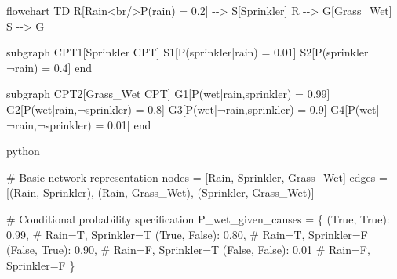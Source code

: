 \documentclass[
  11pt,
  letterpaper,
]{book}
\newenvironment{Shaded}{\begin{snugshade}}{\end{snugshade}}
\newcommand{\CommentTok}[1]{\textcolor[rgb]{0.37,0.37,0.37}{#1}}
\newcommand{\FloatTok}[1]{\textcolor[rgb]{0.68,0.00,0.00}{#1}}
\newcommand{\NormalTok}[1]{\textcolor[rgb]{0.00,0.23,0.31}{#1}}
\newcommand{\OperatorTok}[1]{\textcolor[rgb]{0.37,0.37,0.37}{#1}}
\newcommand{\StringTok}[1]{\textcolor[rgb]{0.13,0.47,0.30}{#1}}
\newcommand{\VariableTok}[1]{\textcolor[rgb]{0.07,0.07,0.07}{#1}}
\begin{document}
\begin{Shaded}
\begin{Highlighting}[]
\NormalTok{flowchart TD}
\NormalTok{    R[Rain\textless{}br/\textgreater{}P(rain) = 0.2] {-}{-}\textgreater{} S[Sprinkler]}
\NormalTok{    R {-}{-}\textgreater{} G[Grass\_Wet]}
\NormalTok{    S {-}{-}\textgreater{} G}
    
\NormalTok{    subgraph CPT1[Sprinkler CPT]}
\NormalTok{        S1[P(sprinkler|rain) = 0.01]}
\NormalTok{        S2[P(sprinkler|¬rain) = 0.4]}
\NormalTok{    end}
    
\NormalTok{    subgraph CPT2[Grass\_Wet CPT]}
\NormalTok{        G1[P(wet|rain,sprinkler) = 0.99]}
\NormalTok{        G2[P(wet|rain,¬sprinkler) = 0.8]}
\NormalTok{        G3[P(wet|¬rain,sprinkler) = 0.9]}
\NormalTok{        G4[P(wet|¬rain,¬sprinkler) = 0.01]}
\NormalTok{    end}
\end{Highlighting}
\end{Shaded}

python

\begin{Shaded}
\begin{Highlighting}[]
\CommentTok{\# Basic network representation}
\NormalTok{nodes }\OperatorTok{=}\NormalTok{ [}\StringTok{\textquotesingle{}Rain\textquotesingle{}}\NormalTok{, }\StringTok{\textquotesingle{}Sprinkler\textquotesingle{}}\NormalTok{, }\StringTok{\textquotesingle{}Grass\_Wet\textquotesingle{}}\NormalTok{]}
\NormalTok{edges }\OperatorTok{=}\NormalTok{ [(}\StringTok{\textquotesingle{}Rain\textquotesingle{}}\NormalTok{, }\StringTok{\textquotesingle{}Sprinkler\textquotesingle{}}\NormalTok{), (}\StringTok{\textquotesingle{}Rain\textquotesingle{}}\NormalTok{, }\StringTok{\textquotesingle{}Grass\_Wet\textquotesingle{}}\NormalTok{), (}\StringTok{\textquotesingle{}Sprinkler\textquotesingle{}}\NormalTok{, }\StringTok{\textquotesingle{}Grass\_Wet\textquotesingle{}}\NormalTok{)]}

\CommentTok{\# Conditional probability specification}
\NormalTok{P\_wet\_given\_causes }\OperatorTok{=}\NormalTok{ \{}
\NormalTok{    (}\VariableTok{True}\NormalTok{, }\VariableTok{True}\NormalTok{): }\FloatTok{0.99}\NormalTok{,    }\CommentTok{\# Rain=T, Sprinkler=T}
\NormalTok{    (}\VariableTok{True}\NormalTok{, }\VariableTok{False}\NormalTok{): }\FloatTok{0.80}\NormalTok{,   }\CommentTok{\# Rain=T, Sprinkler=F  }
\NormalTok{    (}\VariableTok{False}\NormalTok{, }\VariableTok{True}\NormalTok{): }\FloatTok{0.90}\NormalTok{,   }\CommentTok{\# Rain=F, Sprinkler=T}
\NormalTok{    (}\VariableTok{False}\NormalTok{, }\VariableTok{False}\NormalTok{): }\FloatTok{0.01}   \CommentTok{\# Rain=F, Sprinkler=F}
\NormalTok{\}}
\end{Highlighting}
\end{Shaded}
\end{document}
